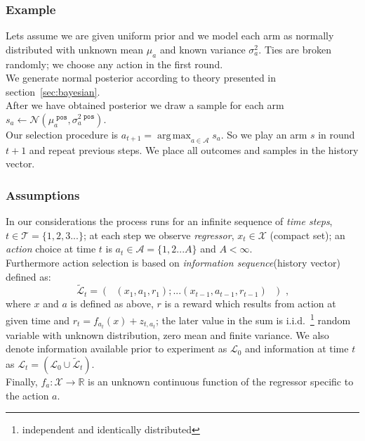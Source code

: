\documentclass[12pt, a4paper, pdflatex, leqno]{report}
\begin{document}
\subsubsection{Example}
Lets assume we are given uniform prior and we model each arm as normally distributed with unknown mean $\mu_a$ and known variance $\sigma^2_a$. Ties are broken randomly; we choose any action in the first round.\\

We generate normal posterior according to theory presented in section~\ref{sec:bayesian}.\\

After we have obtained posterior we draw a sample for each arm $\mathit{s}_a \leftarrow \mathcal{N}(\mu_a^{\texttt{ pos}}, \sigma^{2\texttt{ pos}}_a)$.\\

Our selection procedure is $\mathit{a}_{t+1} = \operatorname{arg\,max}_{a \in \mathscr{A}} \mathit{s}_a$. So we play an arm $s$ in round $t+1$ and repeat previous steps. We place all outcomes and samples in the history vector.\\


\subsubsection{Assumptions}
In our considerations the process runs for an infinite sequence of \emph{time steps}, $t \in \mathscr{T} = \{ 1,2,3... \}$; at each step we observe \emph{regressor}, $x_t \in \mathscr{X}$ (compact set); an \emph{action} choice at time $t$ is $a_t \in \mathscr{A} = \{ 1,2...A \}$ and $A<\infty$.\\
Furthermore action selection is based on \emph{information sequence}(history vector) defined as:
$$
  \tilde{\mathscr{L}}_t = \left( \text{  } (x_1,a_1,r_1);...(x_{t-1},a_{t-1},r_{t-1}) \text{  } \right) \text{ ,}
$$
where $x$ and $a$ is defined as above, $r$ is a reward which results from action at given time and $r_t = f_{a_t}(x) + z_{t,a_t}$; the later value in the sum is i.i.d.\ \footnote{independent and identically distributed} random variable with unknown distribution, zero mean and finite variance. We also denote information available prior to experiment as $\mathscr{L}_0$ and information at time $t$ as $\mathscr{L}_t = \left( \mathscr{L}_0 \cup \tilde{\mathscr{L}}_t \right)$.\\
Finally, $f_a : \mathscr{X} \rightarrow \mathbb{R}$ is an unknown continuous function of the regressor specific to the action $a$.\\
\end{document}
